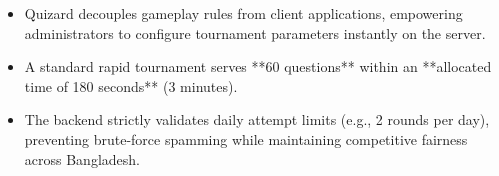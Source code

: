 \begin{tcolorbox}[summarybox, title={Chapter Key Takeaways}]
\begin{itemize}
    \item Quizard decouples gameplay rules from client applications, empowering administrators to configure tournament parameters instantly on the server.
    \item A standard rapid tournament serves **60 questions** within an **allocated time of 180 seconds** (3 minutes).
    \item The backend strictly validates daily attempt limits (e.g., 2 rounds per day), preventing brute-force spamming while maintaining competitive fairness across Bangladesh.
\end{itemize}
\end{tcolorbox}
